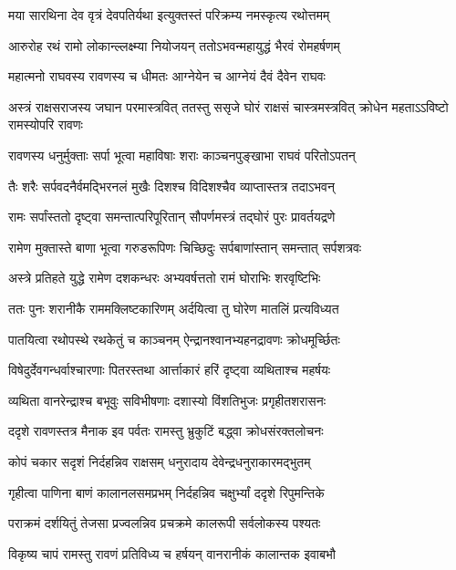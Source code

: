\twolineshloka
{मया सारथिना देव वृत्रं देवपतिर्यथा}
{इत्युक्तस्तं परिक्रम्य नमस्कृत्य रथोत्तमम्} %

\twolineshloka
{आरुरोह रथं रामो लोकान्ल्लक्ष्म्या नियोजयन्}
{ततोऽभवन्महायुद्धं भैरवं रोमहर्षणम्} %

\twolineshloka
{महात्मनो राघवस्य रावणस्य च धीमतः}
{आग्नेयेन च आग्नेयं दैवं दैवेन राघवः} %

\threelineshloka
{अस्त्रं राक्षसराजस्य जघान परमास्त्रवित्}
{ततस्तु ससृजे घोरं राक्षसं चास्त्रमस्त्रवित्}
{क्रोधेन महताऽऽविष्टो रामस्योपरि रावणः} %

\twolineshloka
{रावणस्य धनुर्मुक्ताः सर्पा भूत्वा महाविषाः}
{शराः काञ्चनपुङ्खाभा राघवं परितोऽपतन्} %

\twolineshloka
{तैः शरैः सर्पवदनैर्वमद्भिरनलं मुखैः}
{दिशश्च विदिशश्चैव व्याप्तास्तत्र तदाऽभवन्} %

\twolineshloka
{रामः सर्पांस्ततो दृष्ट्वा समन्तात्परिपूरितान्}
{सौपर्णमस्त्रं तद्घोरं पुरः प्रावर्तयद्रणे} %

\twolineshloka
{रामेण मुक्तास्ते बाणा भूत्वा गरुडरूपिणः}
{चिच्छिदुः सर्पबाणांस्तान् समन्तात् सर्पशत्रवः} %

\twolineshloka
{अस्त्रे प्रतिहते युद्धे रामेण दशकन्धरः}
{अभ्यवर्षत्ततो रामं घोराभिः शरवृष्टिभिः} %

\twolineshloka
{ततः पुनः शरानीकै राममक्लिष्टकारिणम्}
{अर्दयित्वा तु घोरेण मातलिं प्रत्यविध्यत} %

\twolineshloka
{पातयित्वा रथोपस्थे रथकेतुं च काञ्चनम्}
{ऐन्द्रानश्वानभ्यहनद्रावणः क्रोधमूर्च्छितः} %

\twolineshloka
{विषेदुर्देवगन्धर्वाश्चारणाः पितरस्तथा}
{आर्त्ताकारं हरिं दृष्ट्वा व्यथिताश्च महर्षयः} %

\twolineshloka
{व्यथिता वानरेन्द्राश्च बभूवुः सविभीषणाः}
{दशास्यो विंशतिभुजः प्रगृहीतशरासनः} %

\twolineshloka
{ददृशे रावणस्तत्र मैनाक इव पर्वतः}
{रामस्तु भ्रुकुटिं बद्ध्वा क्रोधसंरक्तलोचनः} %

\twolineshloka
{कोपं चकार सदृशं निर्दहन्निव राक्षसम्}
{धनुरादाय देवेन्द्रधनुराकारमद्भुतम्} %

\twolineshloka
{गृहीत्वा पाणिना बाणं कालानलसमप्रभम्}
{निर्दहन्निव चक्षुर्भ्यां ददृशे रिपुमन्तिके} %

\twolineshloka
{पराक्रमं दर्शयितुं तेजसा प्रज्वलन्निव}
{प्रचक्रमे कालरूपी सर्वलोकस्य पश्यतः} %

\twolineshloka
{विकृष्य चापं रामस्तु रावणं प्रतिविध्य च}
{हर्षयन् वानरानीकं कालान्तक इवाबभौ} %

